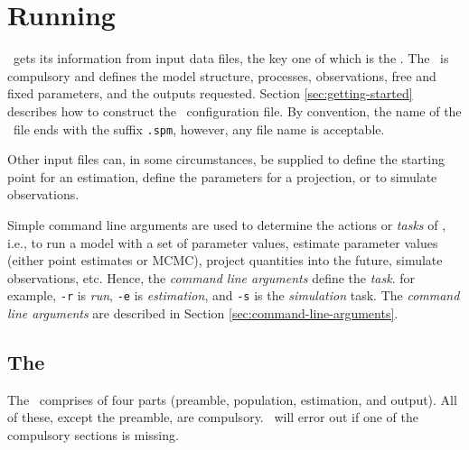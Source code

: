 \section{Running \SPM\label{sec:running-spm}}

\SPM\ gets its information from input data files, the key one of which is the \config{}. The \config\ is compulsory and defines the model structure, processes, observations, free and fixed parameters, and the outputs requested. Section \ref{sec:getting-started} describes how to construct the \SPM\ configuration file. By convention, the name of the \config\ file ends with the suffix \texttt{.spm}, however, any file name is acceptable.

Other input files can, in some circumstances, be supplied to define the starting point for an estimation, define the parameters for a projection, or to simulate observations.  

Simple command line arguments are used to determine the actions or \emph{tasks} of \SPM, i.e., to run a model with a set of parameter values, estimate parameter values (either point estimates or MCMC), project quantities into the future, simulate observations, etc. Hence, the \emph{command line arguments} define the \emph{task}. for example, \texttt{-r} is \emph{run}, \texttt{-e} is \emph{estimation}, and \texttt{-s} is the \emph{simulation} task. The \emph{command line arguments} are described in Section \ref{sec:command-line-arguments}.

\subsection{The \config\label{sec:config-files}}

The \config\ comprises of four parts (preamble, population, estimation, and output). All of these, except the preamble, are compulsory. \SPM\ will error out if one of the compulsory sections is missing.


